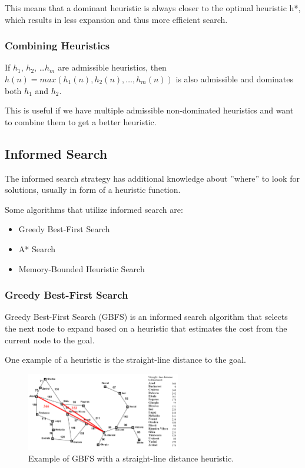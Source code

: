 \documentclass[
../../EiKI_Summary.tex,
]
{subfiles}
\begin{document}
This means that a dominant heuristic is always closer to the optimal heuristic h*, which results in less expansion and thus more efficient search.

\subsubsection{Combining Heuristics}
\begin{defbox*}
    If $h_1$, $h_2$, \dots $h_m$ are admissible heuristics, then $h(n) = max(h_1(n), h_2(n),\dots,  h_m(n))$ is also admissible and dominates both $h_1$ and $h_2$.
\end{defbox*}

This is useful if we have multiple admissible non-dominated heuristics and want to combine them to get a better heuristic. 

\subsection{Informed Search}
\begin{defbox}
    [Definition]
    The informed search strategy has additional knowledge about ''where'' to look for solutions, usually in form of a heuristic function.

    Some algorithms that utilize informed search are:
    \begin{itemize}
        \item Greedy Best-First Search
        \item A* Search
        \item Memory-Bounded Heuristic Search
    \end{itemize}
\end{defbox}


\subsubsection{Greedy Best-First Search}
Greedy Best-First Search (GBFS) is an informed search algorithm that selects the next node to expand based on a heuristic that estimates the cost from the current node to the goal. 

One example of a heuristic is the straight-line distance to the goal. 

\begin{figure}[h!]
    \centering
    \includegraphics[width=0.6\textwidth]{Pics/3/GreedyBestFirstExample.png}
    \caption{Example of GBFS with a straight-line distance heuristic.}
\end{figure}
\end{document}
